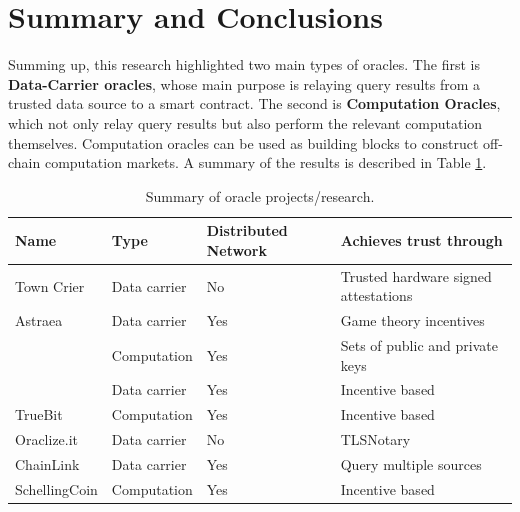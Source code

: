 \section{Summary and Conclusions}

Summing up, this research highlighted two main types of oracles. The first is \textbf{Data-Carrier oracles}, whose main purpose is relaying query results from a trusted data source to a smart contract. The second is \textbf{Computation Oracles}, which not only relay query results but also perform the relevant computation themselves. Computation oracles can be used as building blocks to construct off-chain computation markets. A summary of the results is described in Table \ref{oracle-summary}.

\begin{table}[]
  \centering
  \begin{tabular}{llll}
    \hline
    Name                                      & Type         & Distributed Network & Achieves trust through               \\ \hline
    Town Crier                                & Data carrier & No                  & Trusted hardware signed attestations \\
    Astraea                                   & Data carrier & Yes                 & Game theory incentives               \\
    \cite{Gordon2017ProvenanceSensorsb}       & Computation  & Yes                 & Sets of public and private keys      \\
    \cite{MontotoMonroy2018BitcoinBlockchain} & Data carrier & Yes                 & Incentive based                      \\
    TrueBit                                   & Computation  & Yes                 & Incentive based                      \\
    Oraclize.it                               & Data carrier & No                  & TLSNotary                            \\
    ChainLink                                 & Data carrier & Yes                 & Query multiple sources               \\
    SchellingCoin                             & Computation  & Yes                 & Incentive based                      \\ \hline
  \end{tabular}
  \caption{Summary of oracle projects/research.}
  \label{oracle-summary}
\end{table}

